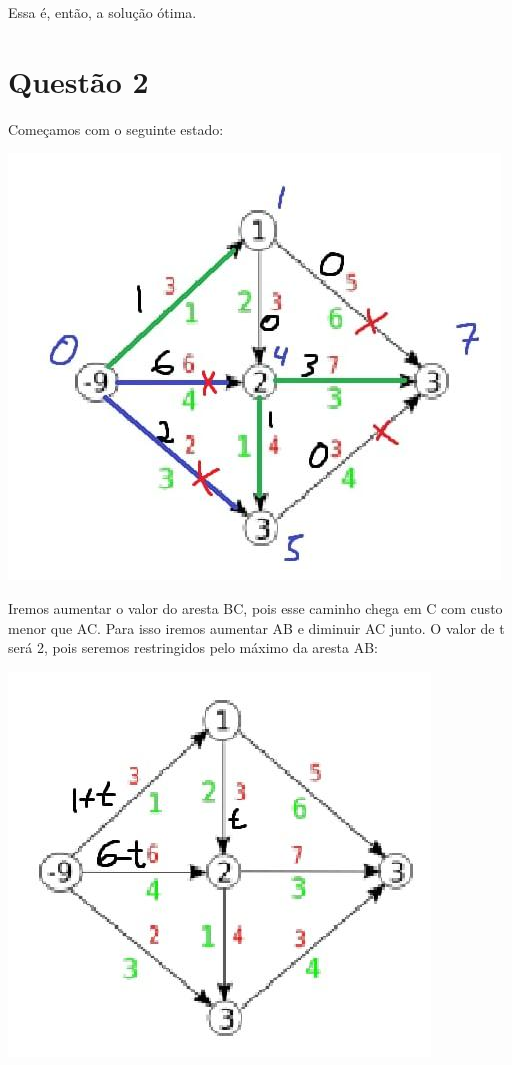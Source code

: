 \documentclass[11pt]{article}
\begin{document}
Essa é, então, a solução ótima.

\newpage
\section{Questão 2}
\label{sec:org9589e0c}
Começamos com o seguinte estado:
\begin{center}
\includegraphics[width=.9\linewidth]{21.jpg}
\end{center}

\newpage
Iremos aumentar o valor do aresta BC, pois esse caminho chega em C com custo menor que AC. Para isso iremos aumentar AB e diminuir AC junto. O valor de t será 2, pois seremos restringidos pelo máximo da aresta AB:
\begin{center}
\includegraphics[width=.9\linewidth]{22.jpg}
\end{center}
\end{document}
